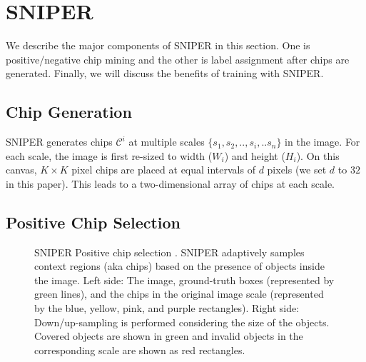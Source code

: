 \documentclass{article}
\begin{document}
\section{SNIPER}
We describe the major components of SNIPER in this section. One is positive/negative chip mining and the other is label assignment after chips are generated. Finally, we will discuss the benefits of training with SNIPER.

\subsection{Chip Generation}
SNIPER generates chips $\mathcal{C}^i$ at multiple scales $\{s_1, s_2,.., s_i,.. s_n\}$ in the image. For each scale, the image is first re-sized to width ($W_i$) and height ($H_i$). On this canvas, $K \times K$ pixel chips are placed at equal intervals of $d$ pixels (we set $d$ to $32$ in this paper). This leads to a two-dimensional array of chips at each scale.

\subsection{Positive Chip Selection}

\begin{figure}
\caption{SNIPER Positive chip selection . SNIPER adaptively samples context regions (aka chips) based on the presence of objects inside the image. Left side: The image, ground-truth boxes (represented by green lines), and the chips in the original image scale (represented by the blue, yellow, pink, and purple rectangles). Right side: Down/up-sampling is performed considering the size of the objects. Covered objects are shown in green and invalid objects in the corresponding scale are shown as red rectangles. }
\label{fig:pos_chips}
\end{figure} 
\end{document}
